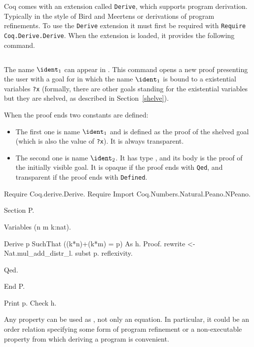 

Coq comes with an extension called {\tt Derive}, which supports
program derivation. Typically in the style of Bird and Meertens or
derivations of program refinements. To use the {\tt Derive} extension
it must first be required with {\tt Require Coq.Derive.Derive}. When
the extension is loaded, it provides the following command.

\subsection[\tt Derive \ident$_1$ SuchThat \term{} As \ident$_2$]
       {}

The name $\ident_1$ can appear in \term. This command opens a new
proof presenting the user with a goal for \term{} in which the name
$\ident_1$ is bound to a existential variables {\tt ?x} (formally,
there are other goals standing for the existential variables but they
are shelved, as described in Section~\ref{shelve}).

When the proof ends two constants are defined:
\begin{itemize}
\item The first one is name $\ident_1$ and is defined as the proof of
  the shelved goal (which is also the value of {\tt ?x}). It is
always transparent.
\item The second one is name $\ident_2$. It has type {\tt \term}, and
  its body is the proof of the initially visible goal. It is opaque if
  the proof ends with {\tt Qed}, and transparent if the proof ends
  with {\tt Defined}.
\end{itemize}

\Example
\begin{coq_example*}
Require Coq.derive.Derive.
Require Import Coq.Numbers.Natural.Peano.NPeano.

Section P.

Variables (n m k:nat).

\end{coq_example*}
\begin{coq_example}
Derive p SuchThat ((k*n)+(k*m) = p) As h.
Proof.
rewrite <- Nat.mul_add_distr_l.
subst p.
reflexivity.
\end{coq_example}
\begin{coq_example*}
Qed.

End P.

\end{coq_example*}
\begin{coq_example}
Print p.
Check h.
\end{coq_example}

Any property can be used as \term, not only an equation. In
particular, it could be an order relation specifying some form of
program refinement or a non-executable property from which deriving a
program is convenient.
